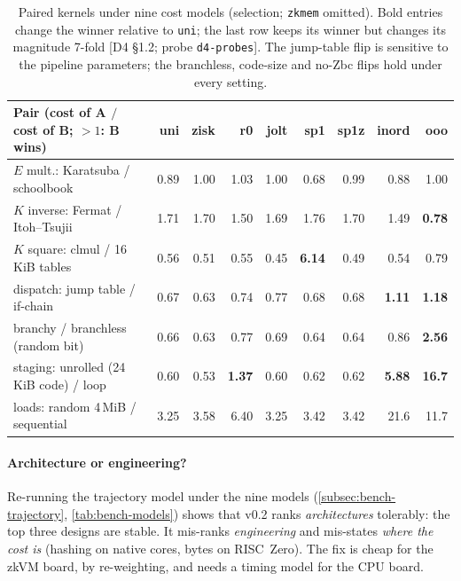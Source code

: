 \begin{table}[t]
\centering\footnotesize
\setlength{\tabcolsep}{3.5pt}
\begin{tabular}{@{}>{\raggedright\arraybackslash}p{4.6cm}rrrrrrrr@{}}
\toprule
Pair (cost of A $/$ cost of B; $>1$: B wins) & uni & zisk & r0 & jolt & sp1 & sp1z & inord & ooo \\
\midrule
$E$ mult.: Karatsuba / schoolbook & 0.89 & 1.00 & 1.03 & 1.00 & 0.68 & 0.99 & 0.88 & 1.00 \\
$K$ inverse: Fermat / Itoh--Tsujii & 1.71 & 1.70 & 1.50 & 1.69 & 1.76 & 1.70 & 1.49 & \textbf{0.78} \\
$K$ square: clmul / 16\,KiB tables & 0.56 & 0.51 & 0.55 & 0.45 & \textbf{6.14} & 0.49 & 0.54 & 0.79 \\
dispatch: jump table / if-chain & 0.67 & 0.63 & 0.74 & 0.77 & 0.68 & 0.68 & \textbf{1.11} & \textbf{1.18} \\
branchy / branchless (random bit) & 0.66 & 0.63 & 0.77 & 0.69 & 0.64 & 0.64 & 0.86 & \textbf{2.56} \\
staging: unrolled (24\,KiB code) / loop & 0.60 & 0.53 & \textbf{1.37} & 0.60 & 0.62 & 0.62 & \textbf{5.88} & \textbf{16.7} \\
loads: random 4\,MiB / sequential & 3.25 & 3.58 & 6.40 & 3.25 & 3.42 & 3.42 & 21.6 & 11.7 \\
\bottomrule
\end{tabular}
\caption{Paired kernels under nine cost models (selection; \texttt{zkmem} omitted). Bold entries change
the winner relative to \texttt{uni}; the last row keeps its winner but changes its magnitude 7-fold
[D4 §1.2; probe \texttt{d4-probes}]. The jump-table flip is sensitive to the pipeline parameters; the
branchless, code-size and no-Zbc flips hold under every setting.}
\label{tab:cost-flips}
\end{table}

\paragraph{Architecture or engineering?} Re-running the trajectory model under the nine models
(\cref{subsec:bench-trajectory}, \cref{tab:bench-models}) shows that v0.2 ranks \emph{architectures}
tolerably: the top three designs are stable. It mis-ranks \emph{engineering} and mis-states
\emph{where the cost is} (hashing on native cores, bytes on RISC~Zero). The fix is cheap for the zkVM
board, by re-weighting, and needs a timing model for the CPU board.

